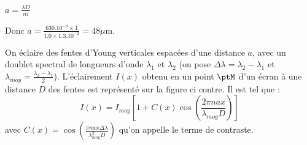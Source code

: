 
\begin{corrige}
	$a=\frac{\lambda D}{ni}$

	Donc $a=\frac{\num{630}.10^{-9} \times \num{1}}{\num{1.0} \times \num{1.3}.10^{-2}}=\num{48}\si{\mu\metre}$.
\end{corrige}


\finEntrainement







\hauteurLargeurCadreReponse		{6mm}{4cm}
\initialisationEntrainement

                                \initialisationPartieGauche %
On éclaire des fentes d'Young verticales espacées d'une distance $a$, avec un doublet spectral de longueurs d'onde $\lambda_1$ et $\lambda_2$ (on pose $\Delta \lambda=\lambda_2 -\lambda_1$ et $\lambda_{moy}=\frac{\lambda_2-\lambda_1}{2}$). L'éclairement $I(x)$ obtenu en un point $\ptM$ d'un écran à une distance $D$ des fentes est représenté sur la figure ci contre. Il est tel que :
$$ I(x)=I_{moy} \left[1+C(x)\cos\left(\frac{2\pi nax}{\lambda_{moy} D}\right)\right] $$ avec $C(x)=\cos\left(\frac{\pi nax \Delta \lambda}{\lambda_{moy}^2 D}\right)$ qu'on appelle le terme de contraste.

